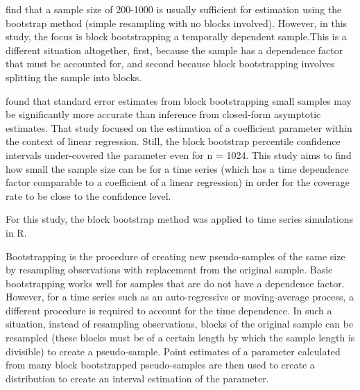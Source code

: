 \documentclass[12pt, letterpaper, titlepage]{article}
\begin{document}
\citet{nevitt2001performance} find that a sample size of 200-1000 is usually sufficient for estimation using the bootstrap method (simple resampling with no blocks involved). However, in this study, the focus is block bootstrapping a temporally dependent sample.This is a different situation altogether, first, because the sample has a dependence factor that must be accounted for, and second because block bootstrapping involves splitting the sample into blocks.

\citet{goncalves2005bootstrap} found that standard error estimates from block bootstrapping small 
samples 
may be significantly more accurate than inference from closed-form asymptotic estimates. That study focused on the estimation of a coefficient parameter within the context of linear regression. Still, the block bootstrap percentile confidence intervals under-covered the parameter even for n = 1024. This study aims to find how small the sample size can be for a time series (which has a time dependence factor comparable to a coefficient of a linear regression) in order for the coverage rate to be close to the confidence level.

For this study, the block bootstrap method was applied to time series simulations in R. 


Bootstrapping is the procedure of creating new pseudo-samples of the same size by resampling observations with replacement from
the original sample. Basic bootstrapping works well for samples
that are do not have a dependence factor. However, for a time series such as an auto-regressive or moving-average process,
a different procedure is required to account for the time dependence. In such a situation, instead of resampling observations, blocks of the original sample can be resampled (these blocks must be of a certain length by which the sample length is divisible) to create a pseudo-sample. Point estimates of a parameter calculated from many block bootstrapped pseudo-samples are then used to create a distribution to create an interval estimation of the parameter.

\end{document}
